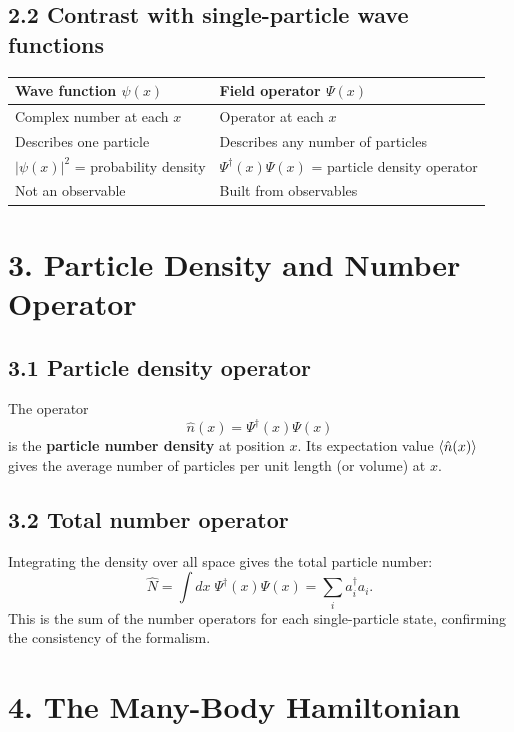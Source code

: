 \documentclass[12pt,a4paper]{article}
\begin{document}
\subsection{2.2 Contrast with single-particle wave functions}

\begin{center}
\begin{tabular}{l l}
\textbf{Wave function $\psi(x)$} & \textbf{Field operator $\Psi(x)$} \\
\hline
Complex number at each $x$ & Operator at each $x$ \\
Describes one particle & Describes any number of particles \\
$|\psi(x)|^2$ = probability density & $\Psi^\dagger(x)\Psi(x)$ = particle density operator \\
Not an observable & Built from observables \\
\end{tabular}
\end{center}

\section{3. Particle Density and Number Operator}

\subsection{3.1 Particle density operator}

The operator
\[
    \hat{n}(x) = \Psi^\dagger(x)\Psi(x)
\]
is the \textbf{particle number density} at position $x$.  Its expectation value $\expval{\hat{n}(x)}$ gives the average number of particles per unit length (or volume) at $x$.

\subsection{3.2 Total number operator}

Integrating the density over all space gives the total particle number:
\[
    \hat{N} = \int dx\;\Psi^\dagger(x)\Psi(x) = \sum_i a_i^\dagger a_i.
\]
This is the sum of the number operators for each single-particle state, confirming the consistency of the formalism.

\section{4. The Many-Body Hamiltonian}
\end{document}

